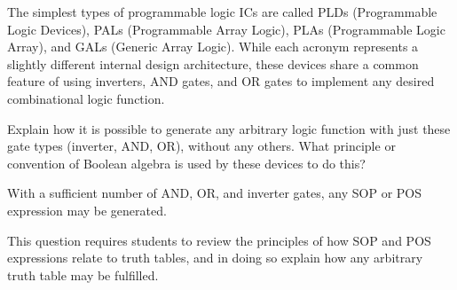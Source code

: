 

The simplest types of programmable logic ICs are called PLDs (Programmable Logic Devices), PALs (Programmable Array Logic), PLAs (Programmable Logic Array), and GALs (Generic Array Logic).  While each acronym represents a slightly different internal design architecture, these devices share a common feature of using inverters, AND gates, and OR gates to implement any desired combinational logic function.

Explain how it is possible to generate any arbitrary logic function with just these gate types (inverter, AND, OR), without any others.  What principle or convention of Boolean algebra is used by these devices to do this?







With a sufficient number of AND, OR, and inverter gates, any SOP or POS expression may be generated.







This question requires students to review the principles of how SOP and POS expressions relate to truth tables, and in doing so explain how any arbitrary truth table may be fulfilled.




